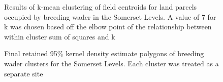 \documentclass[
  12pt,
  letterpaper,
  DIV=11,
  numbers=noendperiod]{scrartcl}
\begin{document}
\begin{figure}[H]


\caption{\label{fig-kmeansclust}Results of k-mean clustering of field
centroids for land parcels occupied by breeding wader in the Somerset
Levels. A value of 7 for k was chosen based off the elbow point of the
relationship between within cluster sum of squares and k}

\end{figure}%

\begin{figure}[H]


\caption{\label{fig-finalclusters}Final retained 95\% kernel density
estimate polygons of breeding wader clusters for the Somerset Levels.
Each cluster was treated as a separate site}

\end{figure}%
\end{document}
